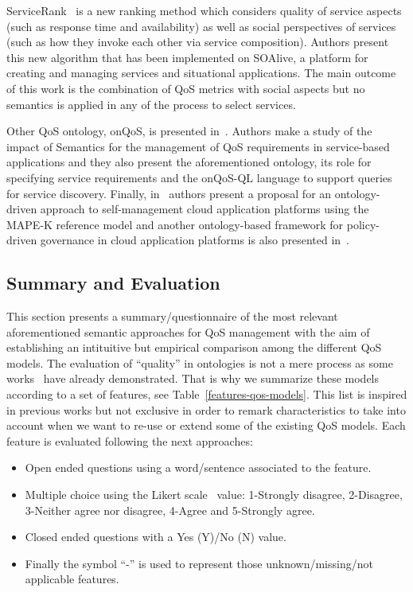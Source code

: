 ServiceRank~\cite{Wu:2009:CQS:1696051.1696105} is a new ranking method which 
considers quality of service aspects (such as response time and availability) as 
well as social perspectives of services (such as how they invoke each other via 
service composition). Authors present this new algorithm that has been 
implemented on SOAlive, a platform for creating and managing services and 
situational applications. The main outcome of this work is the combination of 
QoS metrics with social aspects but no semantics is applied in any of the 
process to select services. 

Other QoS ontology, onQoS, is presented in~\cite{Damiano:2009:OQL:1506129.1506143}. Authors make a study of the impact of 
Semantics for the management of QoS requirements in service-based 
applications and they also present the aforementioned ontology, its role for 
specifying service requirements and the onQoS-QL language to support queries for 
service discovery. Finally, in~\cite{Dautov:2013:ASC:2462307.2462312} authors present a proposal for an 
ontology-driven approach to self-management cloud application platforms using 
the MAPE-K reference model and another ontology-based framework for policy-driven 
governance in cloud application platforms is also presented 
in~\cite{DBLP:conf/icsoc/KourtesisP11}.

\subsection{Summary and Evaluation}
This section presents a summary/questionnaire of the most relevant aforementioned semantic approaches for QoS management 
with the aim of establishing an intituitive  but empirical comparison among the different QoS models. 
The evaluation of ``quality'' in ontologies is not a mere process as some works~\cite{DBLP:conf/dexa/dAquinSSS07,DBLP:conf/nldb/SabouFM09} 
have already demonstrated. That is why we summarize these models according to a set of features, see Table~\ref{features-qos-models}. 
This list is inspired in previous works but not exclusive in order to remark characteristics 
to take into account when we want to re-use or extend some of the existing QoS models. 
Each feature is evaluated following the next approaches:
\begin{itemize}
 \item Open ended questions using a word/sentence associated to the feature.
 \item Multiple choice using the Likert scale~\cite{albaum1997likert} value: 1-Strongly disagree, 2-Disagree, 3-Neither agree nor disagree, 4-Agree and 5-Strongly agree.
 \item Closed ended questions with a Yes (Y)/No (N) value. 
 \item Finally the symbol ``-'' is used to represent those unknown/missing/not applicable features.
\end{itemize}

